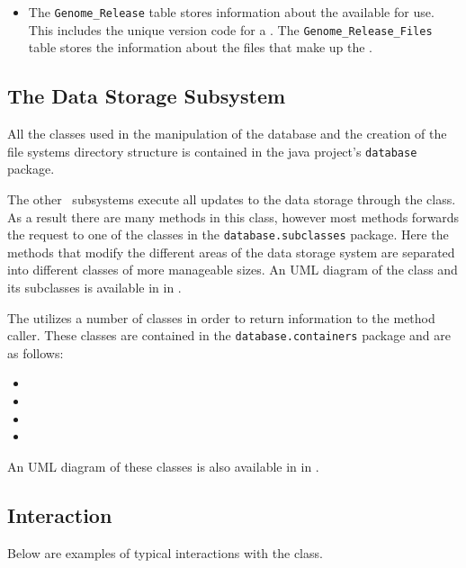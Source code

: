 \begin{itemize}
\item The \texttt{Genome\_Release} table stores information about the  available for use. This includes the unique version code for a \cite{UCSCGRVERSION}. The \texttt{Genome\_Release\_Files} table stores the information about the files that make up the .
\end{itemize}

\subsection{The Data Storage Subsystem}
All the classes used in the manipulation of the database and the creation of the file systems directory structure is contained in the java project's \texttt{database} package.

The other \appName\ subsystems execute all updates to the data storage through the  class. As a result there are many methods in this class, however most methods forwards the request to one of the classes in the \texttt{database.subclasses} package. Here the methods that modify the different areas of the data storage system are separated into different classes of more manageable sizes. An UML diagram of the  class and its subclasses is available in  in  .

The  utilizes a number of classes in order to return information to the method caller. These classes are contained in the \texttt{database.containers} package and are as follows:
\begin{itemize}
\item {}
\item {}
\item {}
\item {}
\end{itemize}

An UML diagram of these classes is also available in  in .

\subsection{Interaction}
Below are examples of typical interactions with the  class.

